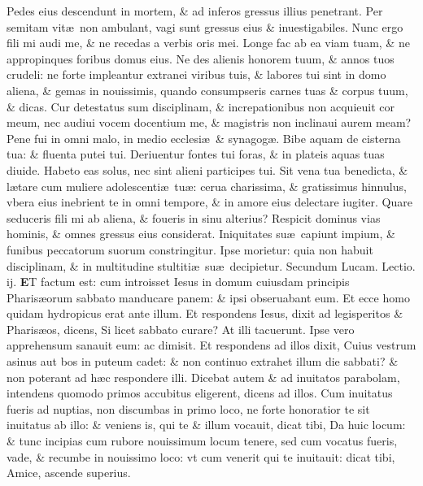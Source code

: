 \documentclass[a5paper,10pt]{book}
\def\rightmarginnote{%
	\lrmarginnote{\hskip\columnwidth \hskip -1em}}
\def\ae{æ}
\begin{document}
\begin{multicols*}{2}
Pedes eius descendunt in mortem, \& ad inferos gressus illius penetrant.
Per semitam vit\ae \ non ambulant, vagi sunt gressus eius \& inuestigabiles.
Nunc ergo fili mi audi me, \& ne recedas a verbis oris mei.
\newline Longe fac ab ea viam tuam, \& ne appropinques foribus domus eius.
Ne des alienis honorem tuum, \& annos tuos crudeli: ne forte impleantur extranei viribus tuis, \& labores tui sint in domo aliena, \& gemas in nouissimis, quando consumpseris carnes tuas \& corpus tuum, \& dicas.
Cur detestatus sum disciplinam, \& increpationibus non acquieuit cor meum, nec audiui vocem docentium me, \& magistris non inclinaui aurem meam?
Pene fui in omni malo, in medio ecclesi\ae \ \& synagog\ae . Bibe aquam de cisterna tua: \& fluenta putei tui.
Deriuentur fontes tui foras, \& in plateis aquas tuas diuide. Habeto eas solus, nec sint alieni participes tui.
Sit vena tua benedicta, \& l\ae tare cum muliere adolescenti\ae \ tu\ae : cerua charissima, \& gratissimus hinnulus, vbera eius inebrient te in omni tempore, \& in amore eius delectare iugiter.
Quare seduceris fili mi ab aliena, \& foueris in sinu alterius?
Respicit dominus vias hominis, \& omnes gressus eius considerat.
Iniquitates su\ae \ capiunt impium, \& funibus peccatorum suorum constringitur.
Ipse morietur: quia non habuit disciplinam, \& in multitudine stultiti\ae \ su\ae \ decipietur.
\newline \color{red} Secundum Lucam. \hfill Lectio. ij. \color{black}
\vspace{-.25em}
\lettrine[lines=2]{\bfseries \color{red} E}{}T\rightmarginnote{c. 14.\\a} factum est: cum introisset Iesus in domum cuiusdam principis Pharis\ae orum sabbato manducare panem: \& ipsi
obseruabant eum.
Et ecce homo quidam hydropicus erat ante illum. Et respondens Iesus, dixit ad legisperitos \& Pharis\ae os, dicens, Si licet sabbato curare?
At illi tacuerunt. Ipse vero apprehensum sanauit eum: ac dimisit.
Et respondens ad illos dixit, Cuius vestrum asinus aut bos in puteum cadet: \& non continuo extrahet illum die sabbati? \& non poterant ad h\ae c respondere illi.
Dicebat autem \& ad inuitatos parabolam, intendens quomodo primos accubitus eligerent, dicens ad illos.
Cum inuitatus fueris ad nuptias, non discumbas in primo loco, ne forte honoratior te sit inuitatus ab illo: \& veniens is, qui te \& illum vocauit, dicat tibi, Da huic locum: \& tunc incipias cum rubore nouissimum locum tenere, sed cum vocatus fueris, vade, \& recumbe in nouissimo loco: vt cum venerit qui te inuitauit: dicat tibi, Amice, ascende superius.

\end{multicols*}
\end{document}
